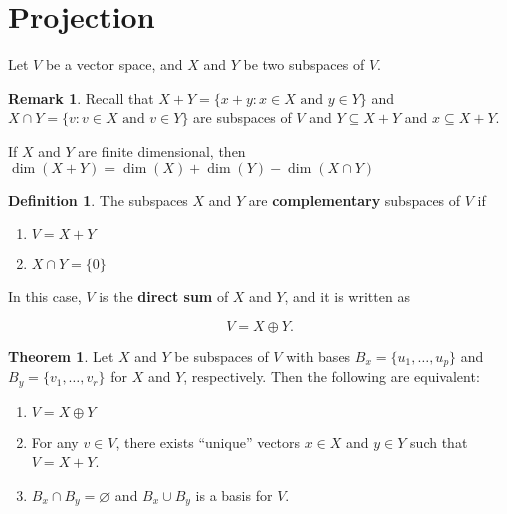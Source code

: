 \documentclass[12pt]{article}
\theoremstyle{definition}
\newtheorem*{definition}{Definition}
\newtheorem{theorem}{Theorem}[section]  %
\newtheorem*{remark}{Remark}
\begin{document}
\section{Projection}

Let $V$ be a vector space, and $X$ and $Y$ be two subspaces of $V$.

\begin{remark}
Recall that $X + Y = \{x + y : x \in X \text{ and } y \in Y\}$ and
$X \cap Y = \{ v : v \in X \text{ and } v \in Y\}$ are subspaces of $V$ and
$Y \subseteq X + Y$ and $x \subseteq X + Y$.

If $X$ and $Y$ are finite dimensional, then 
$\dim(X + Y) = \dim(X) + \dim(Y) - \dim(X \cap Y)$
\end{remark}

\begin{definition}
The subspaces $X$ and $Y$ are \textbf{complementary} subspaces of $V$ if

\begin{enumerate}[label = (\arabic*)]
\item $V = X + Y$
\item $X \cap Y = \{0\}$
\end{enumerate}

In this case, $V$ is the \textbf{direct sum} of $X$ and $Y$, and it is
written as

\[ V = X \oplus Y.\]
\end{definition}


\begin{theorem}
Let $X$ and $Y$ be subspaces of $V$ with bases $B_x = \{u_1, \ldots, u_p\}$ and
$B_y = \{v_1, \ldots, v_r\}$ for $X$ and $Y$, respectively. Then the following are
equivalent:

\begin{enumerate}
\item $V = X \oplus Y$
\item For any $v \in V$, there exists ``unique'' vectors $x \in X$ and $y \in Y$ such that
$V = X + Y$.
\item $B_x \cap B_y = \varnothing$ and $B_x \cup B_y$ is a basis for $V$.
\end{enumerate}
\end{theorem}
\end{document}
